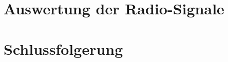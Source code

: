 \begin{refsection}
\section{Auswertung der Radio-Signale}

\section{Schlussfolgerung}

\printbibliography[heading=subbibliography]
\end{refsection}
